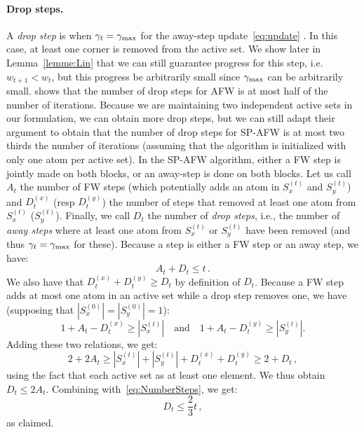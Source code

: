 \documentclass[twoside]{article}
\newcommand{\stepsize}{\gamma}
\newcommand{\stepmax}{\stepsize_{\textnormal{\scriptsize max}}} %
\newcommand{\0}{\mathbf{0}} %
\begin{document}
  \paragraph{Drop steps.} %
  \label{par:drop_steps}
     A \emph{drop step} is when $\gamma_t=\stepmax$ for the away-step update~\eqref{eq:update} \citep{lacoste2015global}. In this case, at least one corner is removed from the active set. We show later in Lemma~\ref{lemme:Lin} that we can still guarantee progress for this step, i.e. $w_{t+1} < w_t$, but this progress be arbitrarily small since $\stepmax$ can be arbitrarily small. \citet{lacoste2015global} shows that the number of drop steps for AFW is at most half of the number of iterations. Because we are maintaining two independent active sets in our formulation, we can obtain more drop steps, but we can still adapt their argument to obtain that the number of drop steps for SP-AFW is at most two thirds the number of iterations (assuming that the algorithm is initialized with only one atom per active set). In the SP-AFW algorithm, either a FW step is jointly made on both blocks, or an away-step is done on both blocks. Let us call~$A_t$ the number of FW steps (which potentially adds an atom in $S^{(t)}_x$ and $S^{(t)}_y$) and $D_t^{(x)}$ (resp $D_t^{(y)}$) the number of steps that removed at least one atom from $S^{(t)}_x$  ($S^{(t)}_y$). Finally, we call $D_t$ the number of \emph{drop steps}, i.e., the number of \emph{away steps} where at least one atom from $S^{(t)}_x$ or $S^{(t)}_y$ have been removed (and thus $\stepsize_t = \stepmax$ for these). Because a step is either a FW step or an away step, we have:
     \begin{equation} \label{eq:NumberSteps}
     A_t + D_t \leq t \, .
     \end{equation}
     We also have that $D_t^{(x)} + D_t^{(y)} \geq D_t$ by definition of $D_t$. Because a FW step adds at most one atom in an active set while a drop step removes one, we have (supposing that $|S^{(0)}_x|=| S^{(0)}_y|=1$):
    \begin{equation}
      1 + A_t -  D_t^{(x)} \geq |S^{(t)}_x| \quad \text{and} \quad 1 + A_t -  D_t^{(y)} \geq |S^{(t)}_y| .
    \end{equation}
    Adding these two relations, we get:
    \begin{equation}
    2 + 2 A_t \geq |S^{(t)}_x| + |S^{(t)}_y| + D_t^{(x)} + D_t^{(y)} \geq 2 + D_t \, ,
    \end{equation}
    using the fact that each active set as at least one element. We thus obtain
    $D_t \leq 2 A_t$. Combining with~\eqref{eq:NumberSteps}, we get:
    \begin{equation} \label{eq:upper_bound_drop_steps}
    D_t \leq \frac{2}{3} t \, ,
    \end{equation}
  as claimed.
\end{document}

